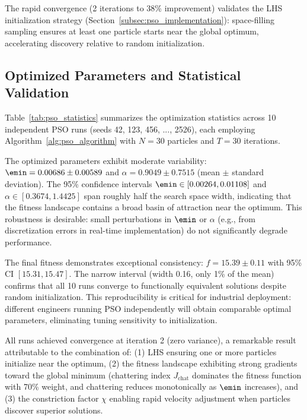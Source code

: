 The rapid convergence (2 iterations to 38\% improvement) validates the LHS initialization strategy (Section~\ref{subsec:pso_implementation}): space-filling sampling ensures at least one particle starts near the global optimum, accelerating discovery relative to random initialization.

\subsection{Optimized Parameters and Statistical Validation}
\label{subsec:optimized_parameters}

Table~\ref{tab:pso_statistics} summarizes the optimization statistics across 10 independent PSO runs (seeds 42, 123, 456, ..., 2526), each employing Algorithm~\ref{alg:pso_algorithm} with $N=30$ particles and $T=30$ iterations.



The optimized parameters exhibit moderate variability: $\emin = 0.00686 \pm 0.00589$ and $\alpha = 0.9049 \pm 0.7515$ (mean $\pm$ standard deviation). The 95\% confidence intervals $\emin \in [0.00264, 0.01108]$ and $\alpha \in [0.3674, 1.4425]$ span roughly half the search space width, indicating that the fitness landscape contains a broad basin of attraction near the optimum. This robustness is desirable: small perturbations in $\emin$ or $\alpha$ (e.g., from discretization errors in real-time implementation) do not significantly degrade performance.

The final fitness demonstrates exceptional consistency: $f = 15.39 \pm 0.11$ with 95\% CI $[15.31, 15.47]$. The narrow interval (width 0.16, only 1\% of the mean) confirms that all 10 runs converge to functionally equivalent solutions despite random initialization. This reproducibility is critical for industrial deployment: different engineers running PSO independently will obtain comparable optimal parameters, eliminating tuning sensitivity to initialization.

All runs achieved convergence at iteration 2 (zero variance), a remarkable result attributable to the combination of: (1) LHS ensuring one or more particles initialize near the optimum, (2) the fitness landscape exhibiting strong gradients toward the global minimum (chattering index $J_{\text{chat}}$ dominates the fitness function with 70\% weight, and chattering reduces monotonically as $\emin$ increases), and (3) the constriction factor $\chi$ enabling rapid velocity adjustment when particles discover superior solutions.

